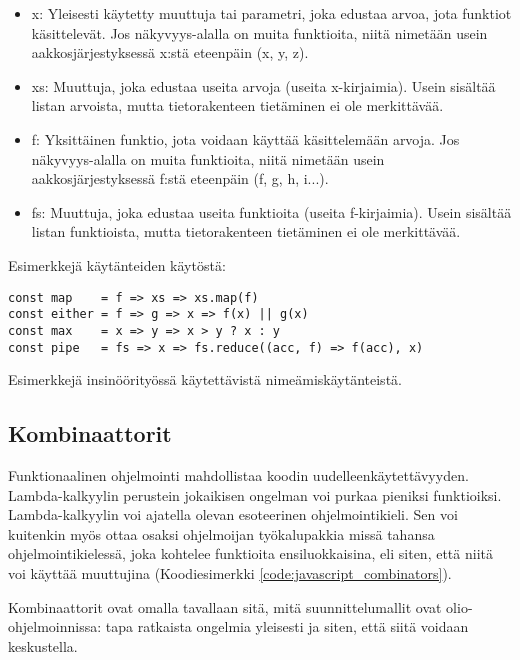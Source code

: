 \begin{itemize}
	\item x: Yleisesti käytetty muuttuja tai parametri, joka edustaa arvoa, jota funktiot käsittelevät. Jos näkyvyys-alalla on muita funktioita, niitä nimetään usein aakkosjärjestyksessä x:stä eteenpäin (x, y, z).
	\item xs: Muuttuja, joka edustaa useita arvoja (useita x-kirjaimia). Usein sisältää listan arvoista, mutta tietorakenteen tietäminen ei ole merkittävää.
	\item f: Yksittäinen funktio, jota voidaan käyttää käsittelemään arvoja. Jos näkyvyys-alalla on muita funktioita, niitä nimetään usein aakkosjärjestyksessä f:stä eteenpäin (f, g, h, i...).
	\item fs: Muuttuja, joka edustaa useita funktioita (useita f-kirjaimia). Usein sisältää listan funktioista, mutta tietorakenteen tietäminen ei ole merkittävää.
\end{itemize}

Esimerkkejä käytänteiden käytöstä:

\begin{code}
	\begin{verbatim}
const map    = f => xs => xs.map(f)
const either = f => g => x => f(x) || g(x)
const max    = x => y => x > y ? x : y
const pipe   = fs => x => fs.reduce((acc, f) => f(acc), x)
\end{verbatim}
	\caption{Esimerkkejä insinöörityössä käytettävistä nimeämiskäytänteistä.}
	\label{code:javascript_naming_convention_example}
\end{code}

\subsection{Kombinaattorit}


Funktionaalinen ohjelmointi mahdollistaa koodin uudelleenkäytettävyyden. Lambda-kalkyylin perustein jokaikisen ongelman voi purkaa pieniksi funktioiksi. \citep{BlellochHarper2015} Lambda-kalkyylin voi ajatella olevan esoteerinen ohjelmointikieli. Sen voi kuitenkin myös ottaa osaksi ohjelmoijan työkalupakkia missä tahansa ohjelmointikielessä, joka kohtelee funktioita ensiluokkaisina, eli siten, että niitä voi käyttää muuttujina (Koodiesimerkki \ref{code:javascript_combinators}).

Kombinaattorit ovat omalla tavallaan sitä, mitä suunnittelumallit ovat olio-ohjelmoinnissa: tapa ratkaista ongelmia yleisesti ja siten, että siitä voidaan keskustella.

